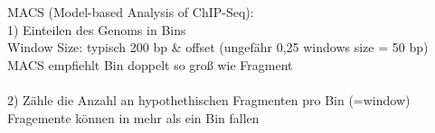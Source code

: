 MACS (Model-based Analysis of ChIP-Seq):\\
1) Einteilen des Genoms in Bins\\
Window Size: typisch 200 bp \& offset (ungefähr 0,25 windows size = 50 bp)\\
MACS empfiehlt Bin doppelt so groß wie Fragment\\
\\
2) Zähle die Anzahl an hypothethischen Fragmenten pro Bin (=window)\\
Fragemente können in mehr als ein Bin fallen

